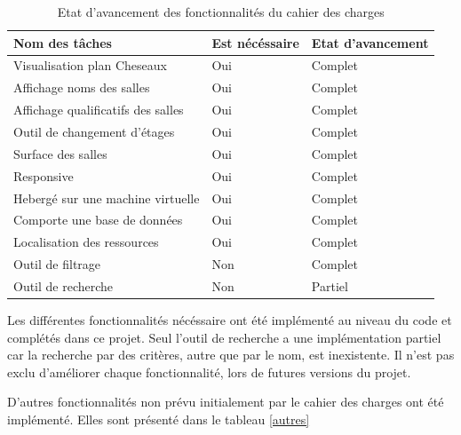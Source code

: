 \documentclass[
    iai, %
    il, %
]{heig-tb}
\begin{document}
\begin{table}[h]
    \begin{center}
        \begin{tabular}{l|l|l}
            Nom des tâches                     & Est nécéssaire & Etat d'avancement \\ \hline
            Visualisation plan Cheseaux        & Oui            & Complet           \\
            Affichage noms des salles          & Oui            & Complet           \\
            Affichage qualificatifs des salles & Oui            & Complet           \\
            Outil de changement d'étages       & Oui            & Complet           \\
            Surface des salles                 & Oui            & Complet           \\
            Responsive                         & Oui            & Complet           \\
            Hebergé sur une machine virtuelle  & Oui            & Complet           \\
            Comporte une base de données       & Oui            & Complet           \\
            Localisation des ressources        & Oui            & Complet           \\
            Outil de filtrage                  & Non            & Complet           \\
            Outil de recherche                 & Non            & Partiel
        \end{tabular}
        \caption{Etat d'avancement des fonctionnalités du cahier des charges \label{charge}}
    \end{center}
\end{table}

Les différentes fonctionnalités nécéssaire ont été implémenté au niveau du code et complétés dans ce projet.
Seul l'outil de recherche a une implémentation partiel car la recherche par des critères, autre que par le nom, est inexistente.
Il n'est pas exclu d'améliorer chaque fonctionnalité, lors de futures versions du projet.

D'autres fonctionnalités non prévu initialement par le cahier des charges ont été implémenté.
Elles sont présenté dans le tableau \ref{autres}
\end{document}
